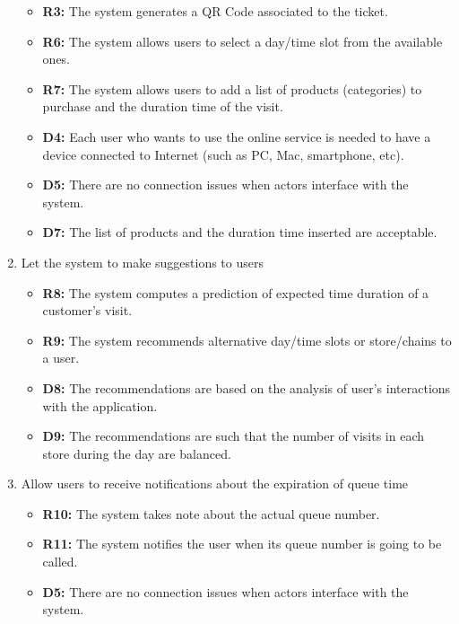 \documentclass[table, 12pt]{article}
\begin{document}
\begin{enumerate}[label=\textbf{-G\arabic*}:]
{\begin{itemize}
              \item \textbf{R3:} The system generates a QR Code associated to the ticket.
              \item \textbf{R6:} The system allows users to select a day/time slot from the available ones.
              \item \textbf{R7:} The system allows users to add a list of products (categories) to purchase and the duration time of the visit.
              \item \textbf{D4:} Each user who wants to use the online service is needed to have a device connected to Internet (such as PC, Mac, smartphone, etc).
              \item \textbf{D5:} There are no connection issues when actors interface with the system.
              \item \textbf{D7:} The list of products and the duration time inserted are acceptable.
          \end{itemize}
          }
    \item {Let the system to make suggestions to users
          \begin{itemize}
              \item \textbf{R8:} The system computes a prediction of expected time duration of a customer's visit.
              \item \textbf{R9:} The system recommends alternative day/time slots or store/chains to a user.
              \item \textbf{D8:} The recommendations are based on the analysis of user's interactions with the application.
              \item \textbf{D9:} The recommendations are such that the number of visits in each store during the day are balanced.
          \end{itemize}
          }
    \item {Allow users to receive notifications about the expiration of queue time
          \begin{itemize}
              \item \textbf{R10:} The system takes note about the actual queue number.
              \item \textbf{R11:} The system notifies the user when its queue number is going to be called.
              \item \textbf{D5:} There are no connection issues when actors interface with the system.
          \end{itemize}
          }
\end{enumerate}
\end{document}
